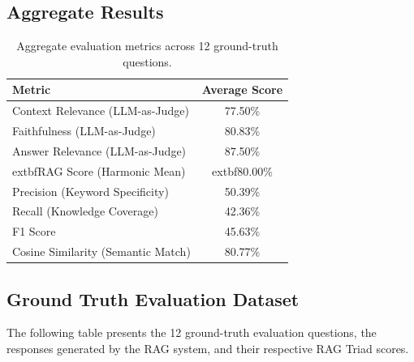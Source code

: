 \documentclass[11pt, a4paper]{article}
\begin{document}
\subsection{Aggregate Results}
\begin{table}[H]
\centering
\begin{tabular}{lc}
\toprule
\textbf{Metric} & \textbf{Average Score} \\
\midrule
Context Relevance (LLM-as-Judge) & 77.50\% \\
Faithfulness (LLM-as-Judge) & 80.83\% \\
Answer Relevance (LLM-as-Judge) & 87.50\% \\
	extbf{RAG Score (Harmonic Mean)} & 	extbf{80.00\%} \\
\midrule
Precision (Keyword Specificity) & 50.39\% \\
Recall (Knowledge Coverage) & 42.36\% \\
F1 Score & 45.63\% \\
Cosine Similarity (Semantic Match) & 80.77\% \\
\bottomrule
\end{tabular}
\caption{Aggregate evaluation metrics across 12 ground-truth questions.}
\end{table}


\subsection{Ground Truth Evaluation Dataset}
The following table presents the 12 ground-truth evaluation questions, the responses generated by the RAG system, and their respective RAG Triad scores.
\end{document}
